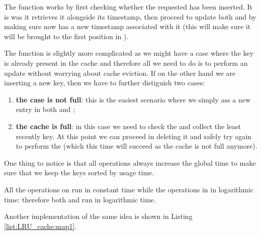 The  function works by first checking whether the requested  has been inserted. It is was it retrieves it alongside its timestamp, then proceed to update both  and  by making sure now  has a new timestamp associated with it (this will make sure it will be brought to the first position in ).

The  function is slightly more complicated as we might have a case where the key is already present in the cache and therefore all we need to do is to perform an update without worrying about cache eviction.
If on the other hand we are inserting a new key, then we have to further distiguish two cases:
\begin{enumerate}
	\item \textbf{the case is not full}: this is the easiest scenario where we simply  ass a new entry in both  and ;
	\item \textbf{the cache is full}: in this case we need to check the  and collect the least recently key. At this point we can proceed in deleting it and safely try again to perform the  (which this time will succeed as the cache is not full anymore).
\end{enumerate}
One thing to notice is that all operations always increase the global time to make sure that we keep the keys sorted by usage time. 

All the operations on  run in constant time while the operations in  in logarithmic time: therefore both  and  run in logarithmic time.



Another implementation of the same idea is shown in Listing \ref{list:LRU_cache:map1}.



